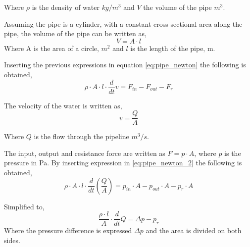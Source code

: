 Where $\rho$ is the density of water $kg/m^3$ and $V$ the volume of the pipe $m^3$.



Assuming the pipe is a cylinder, with a constant cross-sectional area along the pipe, the volume of the pipe can be written as, 
\begin{equation}
 V=A \cdot l
\end{equation}
Where A is the area of a circle, $m^2$ and $l$ is the length of the pipe, m.

Inserting the previous expressions in equation \ref{eq:pipe_newton} the following is obtained,
\begin{equation} \label{eq:pipe_newton_2}
\rho \cdot A \cdot l \cdot \frac{d}{dt}v = F_{in}-F_{out}-F_r 
\end{equation}

The velocity of the water is written as,
\begin{equation}
v=\frac{Q}{A} 
\end{equation}

Where $Q$ is the flow through the pipeline $m^3/s$.

The input, output and resistance force are written as $F=p \cdot A$, where $p$ is the pressure in Pa. By inserting expression in \ref{eq:pipe_newton_2} the following is obtained,
\begin{equation}
\rho \cdot A \cdot l \cdot \frac{d}{dt}\left(\frac{Q}{A}\right) = p_{in}\cdot A - p_{out}\cdot A - p_r \cdot A 
\end{equation}

Simplified to,
\begin{equation}\label{eq:pipe_w_pr}
\frac{\rho \cdot l}{A}\cdot \frac{d}{dt}Q = \Delta p - p_r
\end{equation}
Where the pressure difference is expressed $\Delta p$ and the area is divided on both sides.

